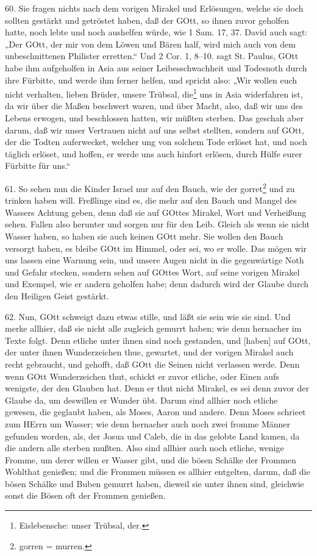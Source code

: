 60. Sie fragen nichts nach dem vorigen Mirakel und Erlösungen, welche sie doch sollten gestärkt und getröstet haben, daß der GOtt, so ihnen zuvor geholfen hatte, noch lebte und noch aushelfen würde, wie 1 Sam. 17, 37. David auch sagt: „Der GOtt, der mir von dem Löwen und Bären half, wird mich auch von dem unbeschnittenen Philister erretten.“ Und 2 Cor. 1, 8–10. sagt St. Paulus, GOtt habe ihm aufgeholfen in Asia aus seiner Leibesschwachheit und Todesnoth durch ihre Fürbitte, und werde ihm ferner helfen, und spricht also: „Wir wollen euch nicht verhalten, lieben Brüder, unsere Trübsal, die\footnote{Eislebensche: unser Trübsal, der.} uns in Asia widerfahren ist, da wir über die Maßen beschwert waren, und über Macht, also, daß wir uns des Lebens erwogen, und beschlossen hatten, wir müßten sterben. Das geschah aber darum, daß wir unser Vertrauen nicht auf uns selbst stellten, sondern auf GOtt, der die Todten auferwecket, welcher
ung von solchem Tode erlöset hat, und noch täglich erlöset, und hoffen, er werde uns auch hinfort erlösen, durch Hülfe eurer Fürbitte für uns.“

61. So sehen nun die Kinder Israel nur auf den Bauch, wie der gorret\footnote{gorren = murren.} und zu trinken haben will. Freßlinge sind es, die mehr auf den Bauch und Mangel des Wassers Achtung geben, denn daß sie auf GOttes Mirakel, Wort und Verheißung sehen. Fallen also herunter und sorgen nur für den Leib. Gleich als wenn sie nicht Wasser haben, so haben sie auch keinen GOtt mehr. Sie wollen den Bauch versorgt haben, es bleibe GOtt im Himmel, oder sei, wo er wolle. Das mögen wir uns lassen eine Warnung sein, und unsere Augen nicht in die gegenwärtige Noth und Gefahr stecken, sondern sehen auf GOttes Wort, auf seine vorigen Mirakel und Exempel, wie er andern geholfen habe; denn dadurch wird der Glaube durch den Heiligen Geist gestärkt.

62. Nun, GOtt schweigt dazu etwas stille, und läßt sie sein wie sie sind. Und merke allhier, daß sie nicht alle zugleich gemurrt haben; wie denn hernacher im Texte folgt. Denn etliche unter ihnen sind noch gestanden, und [haben] auf GOtt, der unter ihnen Wunderzeichen thue, gewartet, und der vorigen Mirakel auch recht gebraucht, und gehofft, daß GOtt die Seinen nicht verlassen werde. Denn wenn GOtt Wunderzeichen thut, schickt er zuvor etliche, oder Einen aufs wenigste, der den Glauben hat. Denn er thut nicht Mirakel, es sei denn zuvor der Glaube da, um deswillen er Wunder übt. Darum sind allhier noch etliche gewesen, die geglaubt haben, als Moses, Aaron und andere. Denn Moses schrieet zum HErrn um Wasser; wie denn hernacher auch noch zwei fromme Männer gefunden worden, als, der Josua und Caleb, die in das gelobte Land kamen, da die andern alle sterben mußten. Also sind allhier auch noch etliche, wenige Fromme, um derer willen er Wasser gibt, und die bösen Schälke der Frommen Wohlthat genießen; und die Frommen müssen es allhier entgelten, darum, daß die bösen Schälke und Buben gemurrt haben, dieweil sie unter ihnen sind, gleichwie sonst die Bösen oft der Frommen genießen.


